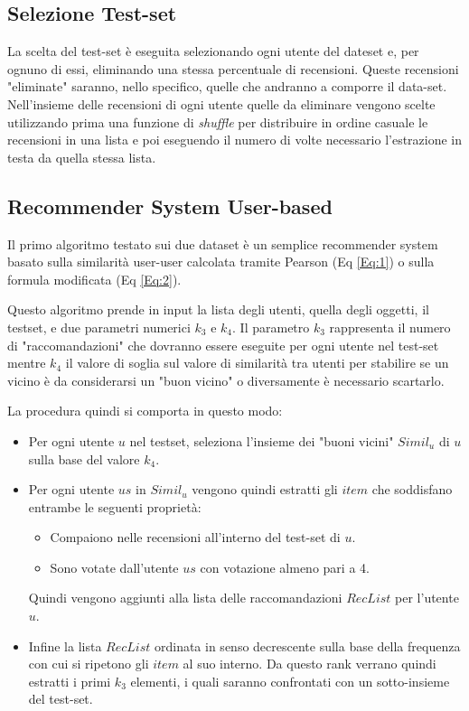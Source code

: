 \documentclass[12pt]{article}
\begin{document}
\subsection{Selezione Test-set}

La scelta del test-set è eseguita selezionando ogni utente del dateset e, per ognuno di essi, eliminando una stessa percentuale di recensioni. Queste recensioni "eliminate" saranno, nello specifico, quelle che andranno a comporre il data-set. Nell'insieme delle recensioni di ogni utente quelle da eliminare vengono scelte utilizzando prima una funzione di \textit{shuffle} per distribuire in ordine casuale le recensioni in una lista e poi eseguendo il numero di volte necessario l'estrazione in testa da quella stessa lista.


\subsection{Recommender System User-based}

Il primo algoritmo testato sui due dataset è un semplice recommender system basato sulla similarità user-user calcolata tramite Pearson (Eq \ref{Eq:1}) o sulla formula modificata (Eq \ref{Eq:2}).

Questo algoritmo prende in input la lista degli utenti, quella degli oggetti, il testset, e due parametri numerici ${k_3}$ e $k_{4}$. Il parametro ${k_3}$ rappresenta il numero di "raccomandazioni" che dovranno essere eseguite per ogni utente nel test-set mentre ${k_4}$ il valore di soglia sul valore di similarità tra utenti per stabilire se un vicino è da considerarsi un "buon vicino" o diversamente è necessario scartarlo.

La procedura quindi si comporta in questo modo: 
\begin{itemize}
\item Per ogni utente $u$ nel testset, seleziona l'insieme dei "buoni vicini" $Simil_u$ di $u$ sulla base del valore $k_4$. 
\item Per ogni utente $us$ in $Simil_u$ vengono quindi estratti gli $item$ che soddisfano entrambe le seguenti proprietà:
\begin{itemize}
\item Compaiono nelle recensioni all'interno del test-set di $u$.
\item Sono votate dall'utente $us$ con votazione almeno pari a 4.
\end{itemize}
Quindi vengono aggiunti alla lista delle raccomandazioni $RecList$ per l'utente $u$.
\item Infine la lista $RecList$ ordinata in senso decrescente sulla base della frequenza con cui si ripetono gli $item$ al suo interno. Da questo rank verrano quindi estratti i primi $k_3$ elementi, i quali saranno confrontati con un sotto-insieme del test-set.
\end{itemize}
\end{document}

